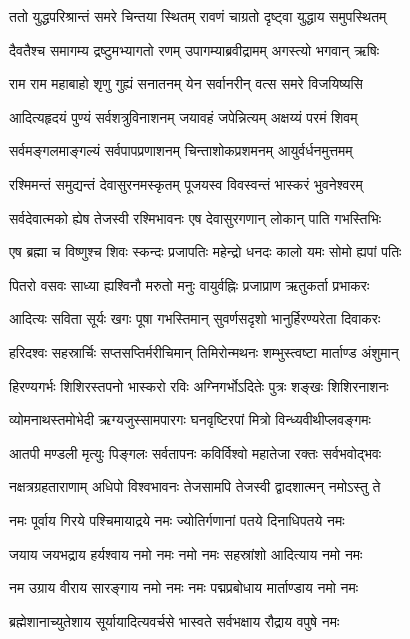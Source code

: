 
\twolineshloka
{ततो युद्धपरिश्रान्तं समरे चिन्तया स्थितम्}
{रावणं चाग्रतो दृष्ट्वा युद्धाय समुपस्थितम्}

\twolineshloka
{दैवतैश्च समागम्य द्रष्टुमभ्यागतो रणम्}
{उपागम्याब्रवीद्रामम् अगस्त्यो भगवान् ऋषिः}

\twolineshloka
{राम राम महाबाहो शृणु गुह्यं सनातनम्}
{येन सर्वानरीन् वत्स समरे विजयिष्यसि}

\twolineshloka
{आदित्यहृदयं पुण्यं सर्वशत्रुविनाशनम्}
{जयावहं जपेन्नित्यम् अक्षय्यं परमं शिवम्}

\twolineshloka
{सर्वमङ्गलमाङ्गल्यं सर्वपापप्रणाशनम्}
{चिन्ताशोकप्रशमनम् आयुर्वर्धनमुत्तमम्}

\twolineshloka
{रश्मिमन्तं समुद्यन्तं देवासुरनमस्कृतम्}
{पूजयस्व विवस्वन्तं भास्करं भुवनेश्वरम्}

\twolineshloka
{सर्वदेवात्मको ह्येष तेजस्वी रश्मिभावनः}
{एष देवासुरगणान् लोकान् पाति गभस्तिभिः}

\twolineshloka
{एष ब्रह्मा च विष्णुश्च शिवः स्कन्दः प्रजापतिः}
{महेन्द्रो धनदः कालो यमः सोमो ह्यपां पतिः}

\twolineshloka
{पितरो वसवः साध्या ह्यश्विनौ मरुतो मनुः}
{वायुर्वह्निः प्रजाप्राण ऋतुकर्ता प्रभाकरः}

\twolineshloka
{आदित्यः सविता सूर्यः खगः पूषा गभस्तिमान्}
{सुवर्णसदृशो भानुर्हिरण्यरेता दिवाकरः}

\twolineshloka
{हरिदश्वः सहस्रार्चिः सप्तसप्तिर्मरीचिमान्}
{तिमिरोन्मथनः शम्भुस्त्वष्टा मार्ताण्ड अंशुमान्}

\twolineshloka
{हिरण्यगर्भः शिशिरस्तपनो भास्करो रविः}
{अग्निगर्भोऽदितेः पुत्रः शङ्खः शिशिरनाशनः}

\twolineshloka
{व्योमनाथस्तमोभेदी ऋग्यजुस्सामपारगः}
{घनवृष्टिरपां मित्रो विन्ध्यवीथीप्लवङ्गमः}

\twolineshloka
{आतपी मण्डली मृत्युः पिङ्गलः सर्वतापनः}
{कविर्विश्वो महातेजा रक्तः सर्वभवोद्भवः}

\twolineshloka
{नक्षत्रग्रहताराणाम् अधिपो विश्वभावनः}
{तेजसामपि तेजस्वी द्वादशात्मन् नमोऽस्तु ते}

\twolineshloka
{नमः पूर्वाय गिरये पश्चिमायाद्रये नमः}
{ज्योतिर्गणानां पतये दिनाधिपतये नमः}

\twolineshloka
{जयाय जयभद्राय हर्यश्वाय नमो नमः}
{नमो नमः सहस्रांशो आदित्याय नमो नमः}

\twolineshloka
{नम उग्राय वीराय सारङ्गाय नमो नमः}
{नमः पद्मप्रबोधाय मार्ताण्डाय नमो नमः}

\twolineshloka
{ब्रह्मेशानाच्युतेशाय सूर्यायादित्यवर्चसे}
{भास्वते सर्वभक्षाय रौद्राय वपुषे नमः}

